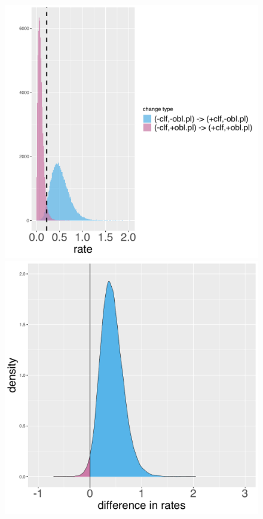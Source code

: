 \documentclass[11pt]{article}
\begin{document}
\begin{figure}[h!]
%
\begin{minipage}[t]{.45\linewidth}
\includegraphics[width=\linewidth]{code/dia_rates.pdf}
\end{minipage}
\hspace{.05\linewidth}
\begin{minipage}[t]{.45\linewidth}
\includegraphics[width=\linewidth]{code/dia_diff.pdf}

\end{minipage}
\end{figure}
\end{document}
